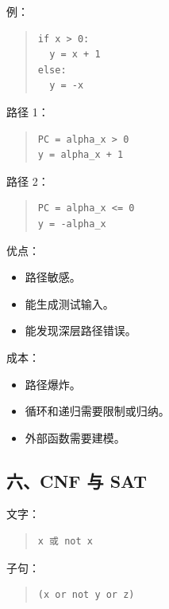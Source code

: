 \documentclass[UTF8,zihao=-4]{ctexart}
\begin{document}
例：


\begin{quote}
\footnotesize
\begin{verbatim}
if x > 0:
  y = x + 1
else:
  y = -x
\end{verbatim}
\end{quote}


路径 1：


\begin{quote}
\footnotesize
\begin{verbatim}
PC = alpha_x > 0
y = alpha_x + 1
\end{verbatim}
\end{quote}


路径 2：


\begin{quote}
\footnotesize
\begin{verbatim}
PC = alpha_x <= 0
y = -alpha_x
\end{verbatim}
\end{quote}


优点：


\begin{itemize}
\item 路径敏感。
\item 能生成测试输入。
\item 能发现深层路径错误。
\end{itemize}


成本：


\begin{itemize}
\item 路径爆炸。
\item 循环和递归需要限制或归纳。
\item 外部函数需要建模。
\end{itemize}


\subsection{六、CNF 与 SAT}


文字：


\begin{quote}
\footnotesize
\begin{verbatim}
x 或 not x
\end{verbatim}
\end{quote}


子句：


\begin{quote}
\footnotesize
\begin{verbatim}
(x or not y or z)
\end{verbatim}
\end{quote}
\end{document}
